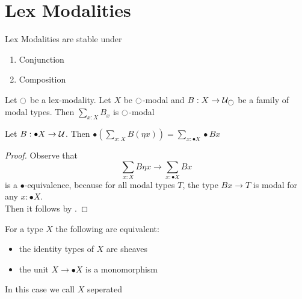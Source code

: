 
\section{Lex Modalities}
\begin{lemma}{\label{lemma:LexStability}}
	Lex Modalities are stable under 
	\begin{enumerate}
		\item Conjunction
		\item Composition
	\end{enumerate}
	
\end{lemma}
\begin{lemma}{\label{lemma:LexSumStable}}
	Let $\ci$ be a lex-modality. Let $X$ be $\ci$-modal and $B : X \to \cU_{\ci}$ be a family of modal types. Then $\sum_{x : X} B_x$ is $\ci$-modal
\end{lemma}
\begin{lemma}{\label{lemma:mod_comm_sum}}
	Let $B  : \bullet X \to \mathcal{U}$. Then $\bullet (\sum_{x : X} B (\eta x)) = \sum_{x : \bullet X} \bullet B x$
\end{lemma}
\begin{proof}
	Observe that 
	\[
	\sum_{x : X} B \eta x \to \sum_{x : \bullet X} B x
	\]
	is a $\bullet$-equivalence, because for all modal types $T$, the type $B x \to T$ is modal for any $x : \bullet X$. \\
	Then it follows by \todocite.
\end{proof}

\begin{lemma}{\label{lemma:sep}}
	For a type $X$ the following are equivalent:
	\begin{itemize}
		\item the identity types of $X$ are sheaves
		\item the unit $X \to \bullet X$ is a monomorphism
	\end{itemize}
In this case we call $X$ seperated
\end{lemma}